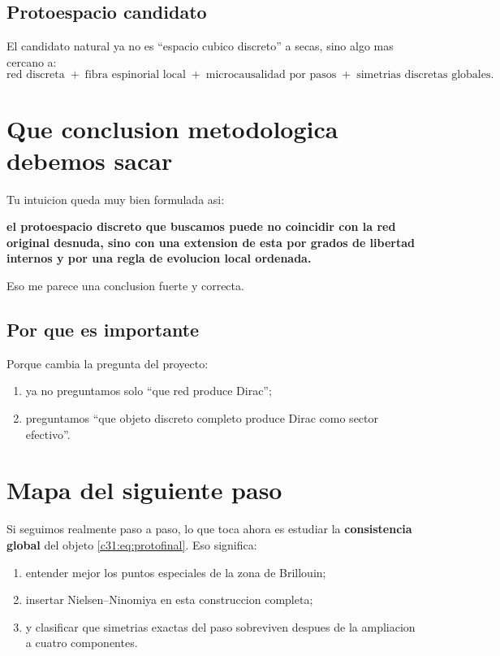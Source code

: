 \subsection{Protoespacio candidato}
El candidato natural ya no es \enquote{espacio cubico discreto} a secas, sino algo mas cercano a:
\begin{equation}
\text{red discreta}
\;+\;
\text{fibra espinorial local}
\;+\;
\text{microcausalidad por pasos}
\;+\;
\text{simetrias discretas globales}.
\label{c31:eq:protofinal}
\end{equation}

\section{Que conclusion metodologica debemos sacar}
Tu intuicion queda muy bien formulada asi:
\begin{displayquote}
\textbf{el protoespacio discreto que buscamos puede no coincidir con la red original desnuda, sino con una extension de esta por grados de libertad internos y por una regla de evolucion local ordenada.}
\end{displayquote}

Eso me parece una conclusion fuerte y correcta.

\subsection{Por que es importante}
Porque cambia la pregunta del proyecto:
\begin{enumerate}[label=\arabic*.]
    \item ya no preguntamos solo \enquote{que red produce Dirac};
    \item preguntamos \enquote{que objeto discreto completo produce Dirac como sector efectivo}.
\end{enumerate}

\section{Mapa del siguiente paso}
Si seguimos realmente paso a paso, lo que toca ahora es estudiar la \textbf{consistencia global} del objeto \eqref{c31:eq:protofinal}. Eso significa:
\begin{enumerate}[label=\arabic*.]
    \item entender mejor los puntos especiales de la zona de Brillouin;
    \item insertar Nielsen--Ninomiya en esta construccion completa;
    \item y clasificar que simetrias exactas del paso sobreviven despues de la ampliacion a cuatro componentes.
\end{enumerate}

